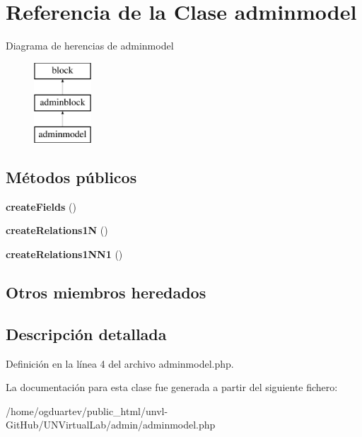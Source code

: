 \hypertarget{classadminmodel}{}\section{Referencia de la Clase adminmodel}
\label{classadminmodel}
Diagrama de herencias de adminmodel\begin{figure}[H]
\begin{center}
\leavevmode
\includegraphics[height=3.000000cm]{classadminmodel}
\end{center}
\end{figure}
\subsection*{Métodos públicos}
\begin{DoxyCompactItemize}
\item 
\mbox{\label{classadminmodel_a719d03fccd7778a3c34d485544ba60e3}} 
{\bfseries create\+Fields} ()
\item 
\mbox{\label{classadminmodel_ae6097b00d7e11027b2de92b9da9eaa92}} 
{\bfseries create\+Relations1N} ()
\item 
\mbox{\label{classadminmodel_afb87584c89afa1378abe6c72c54591a3}} 
{\bfseries create\+Relations1\+N\+N1} ()
\end{DoxyCompactItemize}
\subsection*{Otros miembros heredados}


\subsection{Descripción detallada}


Definición en la línea 4 del archivo adminmodel.\+php.



La documentación para esta clase fue generada a partir del siguiente fichero\+:\begin{DoxyCompactItemize}
\item 
/home/ogduartev/public\+\_\+html/unvl-\/\+Git\+Hub/\+U\+N\+Virtual\+Lab/admin/adminmodel.\+php\end{DoxyCompactItemize}
